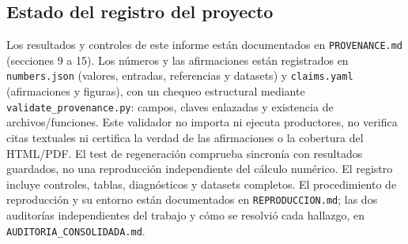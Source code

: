 \subsection{Estado del registro del proyecto}

Los resultados y controles de este informe están documentados en \texttt{PROVENANCE.md} (secciones 9 a 15). Los números y las afirmaciones están registrados en \texttt{numbers.json} (valores, entradas, referencias y datasets) y \texttt{claims.yaml} (afirmaciones y figuras), con un chequeo estructural mediante \texttt{validate\_provenance.py}: campos, claves enlazadas y existencia de archivos/funciones. Este validador no importa ni ejecuta productores, no verifica citas textuales ni certifica la verdad de las afirmaciones o la cobertura del HTML/PDF. El test de regeneración comprueba sincronía con resultados guardados, no una reproducción independiente del cálculo numérico. El registro incluye controles, tablas, diagnósticos y datasets completos. El procedimiento de reproducción y su entorno están documentados en \texttt{REPRODUCCION.md}; las dos auditorías independientes del trabajo y cómo se resolvió cada hallazgo, en \texttt{AUDITORIA\_CONSOLIDADA.md}.
